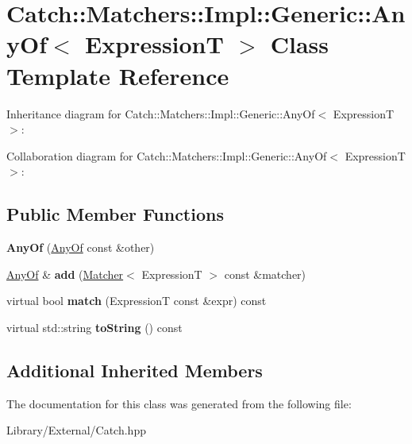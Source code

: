 \hypertarget{class_catch_1_1_matchers_1_1_impl_1_1_generic_1_1_any_of}{}\section{Catch\+:\+:Matchers\+:\+:Impl\+:\+:Generic\+:\+:Any\+Of$<$ Expression\+T $>$ Class Template Reference}
\label{class_catch_1_1_matchers_1_1_impl_1_1_generic_1_1_any_of}


Inheritance diagram for Catch\+:\+:Matchers\+:\+:Impl\+:\+:Generic\+:\+:Any\+Of$<$ Expression\+T $>$\+:


Collaboration diagram for Catch\+:\+:Matchers\+:\+:Impl\+:\+:Generic\+:\+:Any\+Of$<$ Expression\+T $>$\+:
\subsection*{Public Member Functions}
\begin{DoxyCompactItemize}
\item 
\hypertarget{class_catch_1_1_matchers_1_1_impl_1_1_generic_1_1_any_of_a74fbc05b32d334fcbfd0fae0163a404e}{}{\bfseries Any\+Of} (\hyperlink{class_catch_1_1_matchers_1_1_impl_1_1_generic_1_1_any_of}{Any\+Of} const \&other)\label{class_catch_1_1_matchers_1_1_impl_1_1_generic_1_1_any_of_a74fbc05b32d334fcbfd0fae0163a404e}

\item 
\hypertarget{class_catch_1_1_matchers_1_1_impl_1_1_generic_1_1_any_of_a3bce94b627551e5f96c5f9c6060413f0}{}\hyperlink{class_catch_1_1_matchers_1_1_impl_1_1_generic_1_1_any_of}{Any\+Of} \& {\bfseries add} (\hyperlink{struct_catch_1_1_matchers_1_1_impl_1_1_matcher}{Matcher}$<$ Expression\+T $>$ const \&matcher)\label{class_catch_1_1_matchers_1_1_impl_1_1_generic_1_1_any_of_a3bce94b627551e5f96c5f9c6060413f0}

\item 
\hypertarget{class_catch_1_1_matchers_1_1_impl_1_1_generic_1_1_any_of_a2f97a08338e12deba541043a57d73db9}{}virtual bool {\bfseries match} (Expression\+T const \&expr) const \label{class_catch_1_1_matchers_1_1_impl_1_1_generic_1_1_any_of_a2f97a08338e12deba541043a57d73db9}

\item 
\hypertarget{class_catch_1_1_matchers_1_1_impl_1_1_generic_1_1_any_of_a7ecc6ec08b2018a643923a9d450aa328}{}virtual std\+::string {\bfseries to\+String} () const \label{class_catch_1_1_matchers_1_1_impl_1_1_generic_1_1_any_of_a7ecc6ec08b2018a643923a9d450aa328}

\end{DoxyCompactItemize}
\subsection*{Additional Inherited Members}


The documentation for this class was generated from the following file\+:\begin{DoxyCompactItemize}
\item 
Library/\+External/Catch.\+hpp\end{DoxyCompactItemize}

